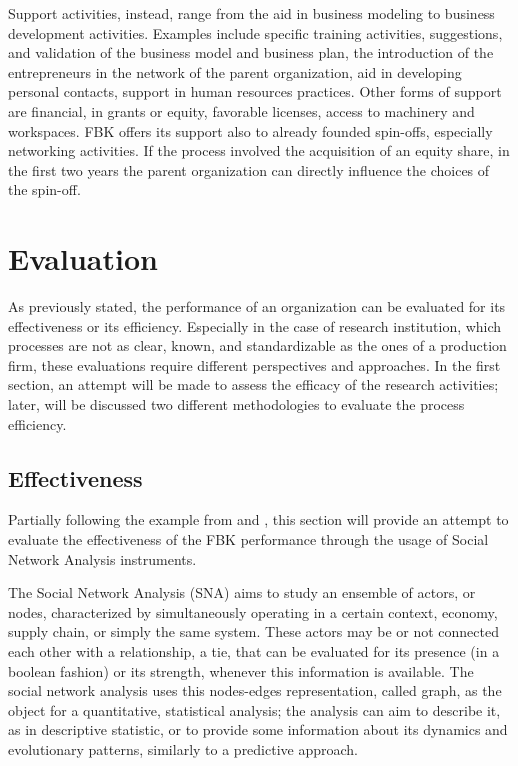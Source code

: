 Support activities, instead, range from the aid in business modeling to business development activities. Examples include specific training activities, suggestions, and validation of the business model and business plan, the introduction of the entrepreneurs in the network of the parent organization, aid in developing personal contacts, support in human resources practices. Other forms of support are financial, in grants or equity, favorable licenses, access to machinery and workspaces. FBK offers its support also to already founded spin-offs, especially networking activities. If the process involved the acquisition of an equity share, in the first two years the parent organization can directly influence the choices of the spin-off.



\section{Evaluation}

As previously stated, the performance of an organization can be evaluated for its effectiveness or its efficiency. Especially in the case of research institution, which processes are not as clear, known, and standardizable as the ones of a production firm, these evaluations require different perspectives and approaches. In the first section, an attempt will be made to assess the efficacy of the research activities; later, will be discussed two different methodologies to evaluate the process efficiency. 

\subsection{Effectiveness}

Partially following the example from \citet{Giuliani2005} and \citet{Cantner2006}, this section will provide an attempt to evaluate the effectiveness of the FBK performance through the usage of Social Network Analysis instruments. 

The Social Network Analysis (SNA) aims to study an ensemble of actors, or nodes, characterized by simultaneously operating in a certain context, economy, supply chain, or simply the same system. These actors may be or not connected each other with a relationship, a tie, that can be evaluated for its presence (in a boolean fashion) or its strength, whenever this information is available. The social network analysis uses this nodes-edges representation, called graph, as the object for a quantitative, statistical analysis; the analysis can aim to describe it, as in descriptive statistic, or to provide some information about its dynamics and evolutionary patterns, similarly to a predictive approach.

